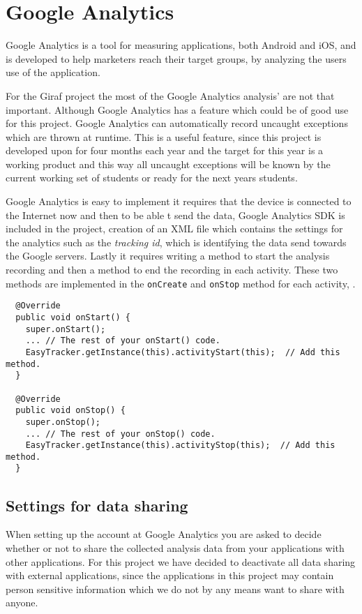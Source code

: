 \section{Google Analytics}

Google Analytics is a tool for measuring applications, both Android and iOS, and is developed to help marketers reach their target groups, by analyzing the users use of the application.

For the Giraf project the most of the Google Analytics analysis' are not that important.
Although Google Analytics has a feature which could be of good use for this project.
Google Analytics can automatically record uncaught exceptions which are thrown at runtime.
This is a useful feature, since this project is developed upon for four months each year and the target for this year is a working product and this way all uncaught exceptions will be known by the current working set of students or ready for the next years students.

Google Analytics is easy to implement it requires that the device is connected to the Internet now and then to be able t send the data, Google Analytics SDK is included in the project, creation of an XML file which contains the settings for the analytics such as the \textit{tracking id}, which is identifying the data send towards the Google servers.
Lastly it requires writing a method to start the analysis recording and then a method to end the recording in each activity. These two methods are implemented in the \texttt{onCreate} and \texttt{onStop} method for each activity, .

\begin{lstlisting}
  @Override
  public void onStart() {
    super.onStart();
    ... // The rest of your onStart() code.
    EasyTracker.getInstance(this).activityStart(this);  // Add this method.
  }

  @Override
  public void onStop() {
    super.onStop();
    ... // The rest of your onStop() code.
    EasyTracker.getInstance(this).activityStop(this);  // Add this method.
  }
\end{lstlisting}

\subsection{Settings for data sharing}
When setting up the account at Google Analytics you are asked to decide whether or not to share the collected analysis data from your applications with other applications.
For this project we have decided to deactivate all data sharing with external applications, since the applications in this project may contain person sensitive information which we do not by any means want to share with anyone.

%
